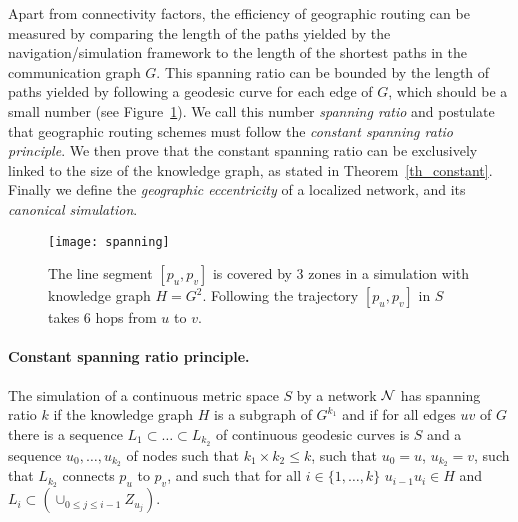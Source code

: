 \documentclass{article}
\begin{document}
Apart from connectivity factors, the efficiency of geographic routing can be measured by comparing the length of the paths yielded by the navigation/simulation framework to the length of the shortest paths in the communication graph $G$. This spanning ratio can be bounded by the length of paths yielded by following a geodesic curve for each edge of $G$, which should be a small number (see Figure~\ref{fig_spanning}). We call this number {\em spanning ratio} and postulate that geographic routing schemes must follow the {\em constant spanning ratio principle}. We then prove that the constant spanning ratio can be exclusively linked to the size of the knowledge graph, as stated in Theorem~\ref{th_constant}. Finally we define the {\em geographic eccentricity} of a localized network, and its {\em canonical simulation}.

\begin{figure}[h]
\begin{center}
\texttt{[image: spanning]}
\caption{The line segment $[p_u,p_v]$ is covered by 3 zones in a simulation with knowledge graph $H=G^2$. Following the trajectory $[p_u,p_v]$ in $S$ takes 6 hops from $u$ to $v$.}
\label{fig_spanning}
\end{center}
\end{figure}

\paragraph{Constant spanning ratio principle.} The simulation of a continuous metric space $S$ by a network $\cal N$ has spanning ratio $k$ if the knowledge graph $H$ is a subgraph of $G^{k_1}$ and if for all edges $uv$ of $G$ there is a sequence $L_1\subset\dots\subset L_{k_2}$ of continuous geodesic curves is $S$ and a sequence $u_0,\dots,u_{k_2}$ of nodes such that $k_1\times k_2\leq k$, such that $u_0=u$, $u_{k_2}=v$, such that $L_{k_2}$ connects $p_u$ to $p_v$, and such that for all $i\in\{1,\dots,k\}$ $u_{i-1}u_i\in H$ and $L_i\subset(\cup_{0\leq j\leq i-1} Z_{u_j})$.
\end{document}
